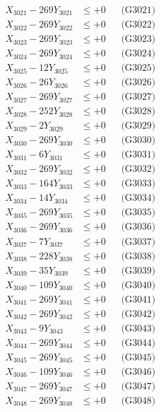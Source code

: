 \documentclass[a4paper,10pt]{article}
\begin{document}
{\begin{align}
\allowbreak
X_{3021} - 269Y_{3021} &\leq +0 && \text{(G3021)} \\
X_{3022} - 269Y_{3022} &\leq +0 && \text{(G3022)} \\
X_{3023} - 269Y_{3023} &\leq +0 && \text{(G3023)} \\
X_{3024} - 269Y_{3024} &\leq +0 && \text{(G3024)} \\
X_{3025} - 12Y_{3025} &\leq +0 && \text{(G3025)} \\
X_{3026} - 26Y_{3026} &\leq +0 && \text{(G3026)} \\
X_{3027} - 269Y_{3027} &\leq +0 && \text{(G3027)} \\
X_{3028} - 252Y_{3028} &\leq +0 && \text{(G3028)} \\
X_{3029} - 2Y_{3029} &\leq +0 && \text{(G3029)} \\
X_{3030} - 269Y_{3030} &\leq +0 && \text{(G3030)} \\
\allowbreak
X_{3031} - 6Y_{3031} &\leq +0 && \text{(G3031)} \\
X_{3032} - 269Y_{3032} &\leq +0 && \text{(G3032)} \\
X_{3033} - 164Y_{3033} &\leq +0 && \text{(G3033)} \\
X_{3034} - 14Y_{3034} &\leq +0 && \text{(G3034)} \\
X_{3035} - 269Y_{3035} &\leq +0 && \text{(G3035)} \\
X_{3036} - 269Y_{3036} &\leq +0 && \text{(G3036)} \\
X_{3037} - 7Y_{3037} &\leq +0 && \text{(G3037)} \\
X_{3038} - 228Y_{3038} &\leq +0 && \text{(G3038)} \\
X_{3039} - 35Y_{3039} &\leq +0 && \text{(G3039)} \\
X_{3040} - 109Y_{3040} &\leq +0 && \text{(G3040)} \\
\allowbreak
X_{3041} - 269Y_{3041} &\leq +0 && \text{(G3041)} \\
X_{3042} - 269Y_{3042} &\leq +0 && \text{(G3042)} \\
X_{3043} - 9Y_{3043} &\leq +0 && \text{(G3043)} \\
X_{3044} - 269Y_{3044} &\leq +0 && \text{(G3044)} \\
X_{3045} - 269Y_{3045} &\leq +0 && \text{(G3045)} \\
X_{3046} - 109Y_{3046} &\leq +0 && \text{(G3046)} \\
X_{3047} - 269Y_{3047} &\leq +0 && \text{(G3047)} \\
X_{3048} - 269Y_{3048} &\leq +0 && \text{(G3048)} \\

\end{align}}
\end{document}
